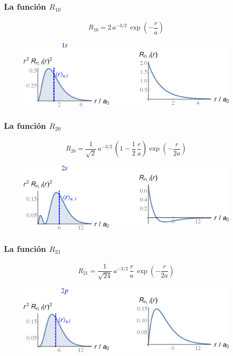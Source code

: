 \begin{frame}
\frametitle{La función $R_{10}$}
\begin{align*}
R_{10} = 2 \, a^{-3/2} \, \exp(-\dfrac{r}{a})
\end{align*}
\pause
\vspace*{-0.5cm}
\begin{figure}
   \centering
   \includegraphics[scale=0.67]{Imagenes/Plot_Funcion_Radial_10.eps}
\end{figure}
\end{frame}
\begin{frame}
\frametitle{La función $R_{20}$}
\begin{align*}
R_{20} = \dfrac{1}{\sqrt{2}} \, a^{-3/2} \, \left( 1 - \dfrac{1}{2} \, \dfrac{r}{a} \right)\exp(-\dfrac{r}{2a})
\end{align*}
\pause
\vspace*{-0.5cm}
\begin{figure}
   \centering
   \includegraphics[scale=0.67]{Imagenes/Plot_Funcion_Radial_20.eps}
\end{figure}
\end{frame}
\begin{frame}
\frametitle{La función $R_{21}$}
\begin{align*}
R_{21} = \dfrac{1}{\sqrt{24}} \, a^{-3/2} \, \dfrac{r}{a} \, \exp(-\dfrac{r}{2a})
\end{align*}
\pause
\vspace*{-0.5cm}
\begin{figure}
   \centering
   \includegraphics[scale=0.67]{Imagenes/Plot_Funcion_Radial_21.eps}
\end{figure}
\end{frame}
